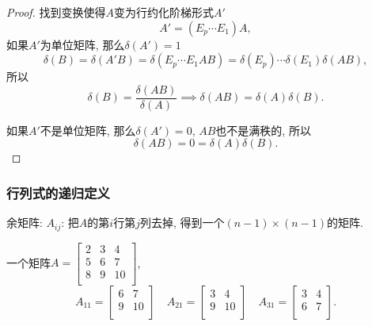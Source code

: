 

\begin{proof}
    找到变换使得$A$变为行约化阶梯形式$A'$
    \begin{equation}
      A' = \left( E_p \cdots E_1 \right) A,
    \end{equation}
    如果$A'$为单位矩阵, 那么$\delta (A') = 1$
    \begin{equation}
      \delta (B) = \delta (A'B) = \delta (E_p \cdots E_1 A B) = \delta (E_p) \cdots \delta (E_1) \delta (AB),
    \end{equation}
    所以
    \begin{equation}
      \delta (B) = \frac{\delta(AB)}{\delta (A)} \implies \delta (AB) = \delta (A) \delta (B).
    \end{equation}

    如果$A'$不是单位矩阵, 那么$\delta (A') = 0$, $AB$也不是满秩的, 所以
    \begin{equation}
      \delta (AB) = 0 = \delta (A) \delta (B).
    \end{equation}
\end{proof}

\subsubsection{行列式的递归定义}
\begin{definition}
    余矩阵: $A_{ij}$: 把$A$的第$i$行第$j$列去掉, 得到一个$ \left( n-1 \right) \times  \left( n-1 \right) $的矩阵.
\end{definition}
\begin{example}
    一个矩阵$A = \begin{bmatrix}
     2 & 3 & 4\\
     5 & 6 & 7\\
     8 & 9 & 10\\
    \end{bmatrix}$,
    \begin{equation}
      A_{11} = \begin{bmatrix}
       6 & 7\\
       9 & 10\\
      \end{bmatrix}
      \quad
      A_{21} = \begin{bmatrix}
       3 & 4\\
       9 & 10\\
      \end{bmatrix}
      \quad
      A_{31} = \begin{bmatrix}
       3 & 4\\
       6 & 7\\
      \end{bmatrix}.
    \end{equation}
\end{example}

